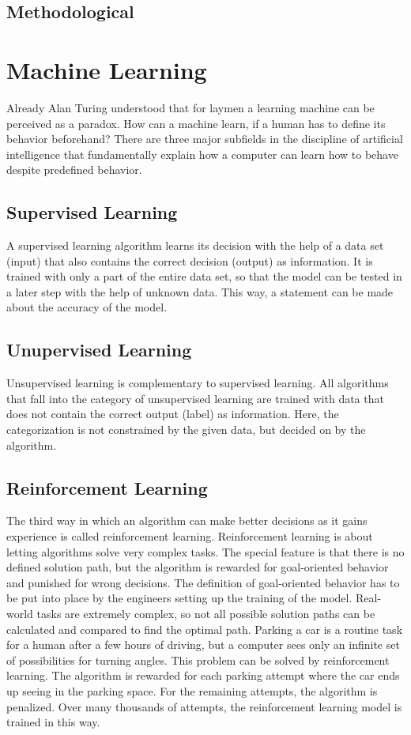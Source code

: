 	
	\subsection{Methodological}
	


\section{Machine Learning}
Already Alan Turing understood that for laymen a learning machine can be perceived as a paradox.  How can a machine learn, if a human has to define its behavior beforehand? There are three major subfields in the discipline of artificial intelligence that fundamentally explain how a computer can learn how to behave despite predefined behavior.

\subsection{Supervised Learning}
A supervised learning algorithm learns its decision with the help of a data set (input) that also contains the correct decision (output) as information. It is trained with only a part of the entire data set, so that the model can be tested in a later step with the help of unknown data. This way, a statement can be made about the accuracy of the model.

\subsection{Unupervised Learning}
Unsupervised learning is complementary to supervised learning. All algorithms that fall into the category of unsupervised learning are trained with data that does not contain the correct output (label) as information. Here, the categorization is not constrained by the given data, but decided on by the algorithm.

\subsection{Reinforcement Learning}
The third way in which an algorithm can make better decisions as it gains experience is called reinforcement learning. Reinforcement learning is about letting algorithms solve very complex tasks. The special feature is that there is no defined solution path, but the algorithm is rewarded for goal-oriented behavior and punished for wrong decisions. The definition of goal-oriented behavior has to be put into place by the engineers setting up the training of the model. Real-world tasks are extremely complex, so not all possible solution paths can be calculated and compared to find the optimal path. Parking a car is a routine task for a human after a few hours of driving, but a computer sees only an infinite set of possibilities for turning angles. This problem can be solved by reinforcement learning. The algorithm is rewarded for each parking attempt where the car ends up seeing in the parking space. For the remaining attempts, the algorithm is penalized. Over many thousands of attempts, the reinforcement learning model is trained in this way.

